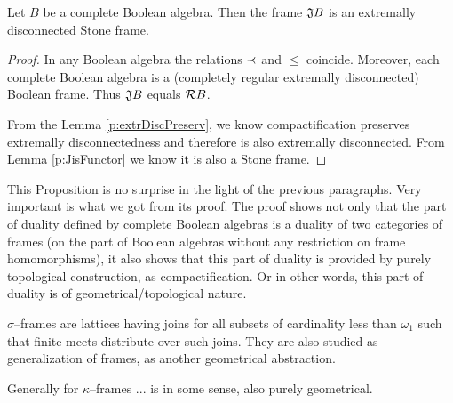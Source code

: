 \begin{proposition*}
    Let $B$ be a complete Boolean algebra. Then the frame $\mathfrak{J} B$ is an extremally disconnected Stone frame.
\end{proposition*}
\begin{proof}
    In any Boolean algebra the relations $\prec$ and $\leq$ coincide. Moreover, each complete Boolean algebra is a (completely regular extremally disconnected) Boolean frame. Thus $\mathfrak{J}{B}$ equals $\mathcal{R}{B}$.

    From the Lemma \ref{p:extrDiscPreserv}, we know compactification preserves extremally disconnectedness and therefore  is also extremally disconnected. From Lemma \ref{p:JisFunctor} we know it is also a Stone frame.
\end{proof}

This Proposition is no surprise in the light of the previous paragraphs. Very important is what we got from its proof. The proof shows not only that the part of duality defined by complete Boolean algebras is a duality of two categories of frames (on the part of Boolean algebras without any restriction on frame homomorphisms), it also shows that this part of duality is provided by purely topological construction, as compactification. Or in other words, this part of duality is of geometrical/topological nature.

\vspace{1em}
\dotfill

$\sigma$--frames are lattices having joins for all subsets of cardinality less than $\omega_1$ such that finite meets distribute over such joins.
They are also studied as generalization of frames, as another geometrical abstraction.

Generally for $\kappa$--frames ... is in some sense,  also purely geometrical.
